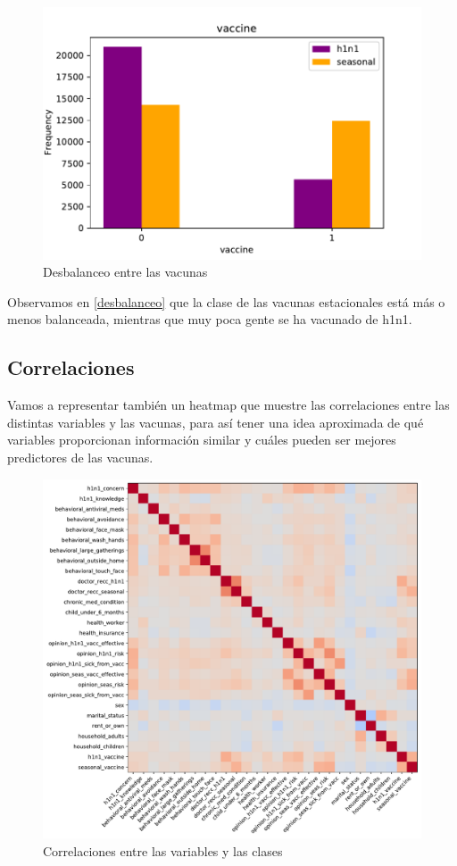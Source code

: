 \documentclass[twoside,openright,titlepage,numbers=noenddot,openany,headinclude,footinclude=true,
cleardoublepage=empty,abstractoff,BCOR=5mm,paper=a4,fontsize=12pt,main=spanish]{scrreprt}
\begin{document}
\begin{figure}[H]
\includegraphics[scale=1]{desbalanceo.pdf}
\caption{Desbalanceo entre las vacunas}
\label{desbalanceo}
\end{figure}

Observamos en \eqref{desbalanceo} que la clase de las vacunas estacionales está más o menos balanceada, mientras que muy poca gente se ha vacunado de h1n1.

\subsection{Correlaciones}

Vamos a representar también un heatmap que muestre las correlaciones entre las distintas variables y las vacunas, para así tener una idea aproximada de qué variables proporcionan información similar y cuáles pueden ser mejores predictores de las vacunas.

\begin{figure}[H]
\includegraphics[scale=0.5]{correlaciones.pdf}
\caption{Correlaciones entre las variables y las clases}
\label{correlaciones}
\end{figure}
\end{document}
